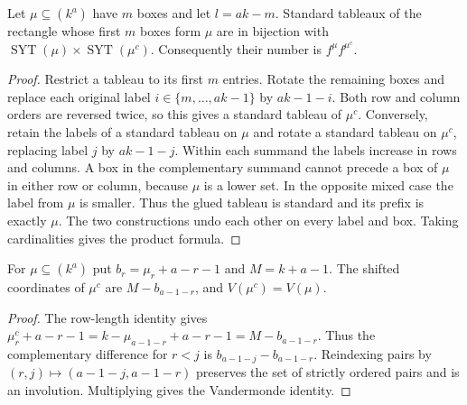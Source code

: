\begin{lemma}
\label{lem:rectangle-prefix-count}
\leanok
Let $\mu\subseteq(k^a)$ have $m$ boxes and let $l=ak-m$.
Standard tableaux of the rectangle whose first $m$ boxes form $\mu$
are in bijection with
$\operatorname{SYT}(\mu)\times\operatorname{SYT}(\mu^c)$.
Consequently their number is $f^\mu f^{\mu^c}$.
\end{lemma}
\begin{proof}
Restrict a tableau to its first $m$ entries. Rotate the remaining
boxes and replace each original label $i\in\{m,\ldots,ak-1\}$
by $ak-1-i$. Both row and column orders are reversed twice, so
this gives a standard tableau of $\mu^c$.
Conversely, retain the labels of a standard tableau on $\mu$ and
rotate a standard tableau on $\mu^c$, replacing label $j$ by
$ak-1-j$. Within each summand the labels increase in rows and
columns. A box in the complementary summand cannot precede a box
of $\mu$ in either row or column, because $\mu$ is a lower set.
In the opposite mixed case the label from $\mu$ is smaller.
Thus the glued tableau is standard and its prefix is exactly $\mu$.
The two constructions undo each other on every label and box.
Taking cardinalities gives the product formula.
\end{proof}

\begin{lemma}
\label{lem:complement-vandermonde}
\leanok
For $\mu\subseteq(k^a)$ put $b_r=\mu_r+a-r-1$ and $M=k+a-1$.
The shifted coordinates of $\mu^c$ are $M-b_{a-1-r}$, and
$V(\mu^c)=V(\mu)$.
\end{lemma}
\begin{proof}
The row-length identity gives
$\mu^c_r+a-r-1=k-\mu_{a-1-r}+a-r-1=M-b_{a-1-r}$.
Thus the complementary difference for $r<j$ is
$b_{a-1-j}-b_{a-1-r}$. Reindexing pairs by
$(r,j)\mapsto(a-1-j,a-1-r)$ preserves the set of strictly ordered
pairs and is an involution. Multiplying gives the Vandermonde identity.
\end{proof}

